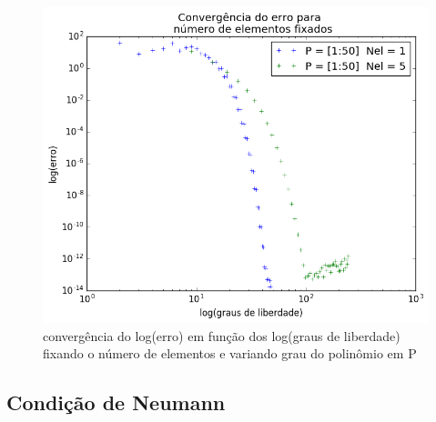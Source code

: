 \begin{figure}[!hb]
  \includegraphics[width=1\textwidth,center]{figuras/convergencia_erro_EDO_p.png}
  \caption{convergência do log(erro) em função dos log(graus de liberdade) fixando o número de elementos e variando grau do polinômio em P  }
\end{figure}

\subsection{Condição de Neumann}



